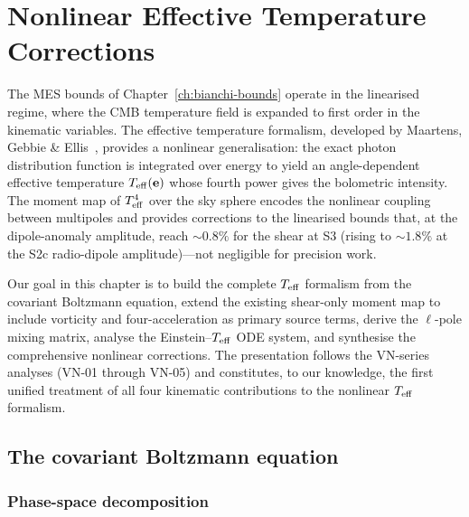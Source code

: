 
\chapter{Nonlinear Effective Temperature Corrections}
\label{ch:teff}

The MES bounds of Chapter~\ref{ch:bianchi-bounds} operate in the
linearised regime, where the CMB temperature field is expanded to
first order in the kinematic variables.  The effective temperature
formalism, developed by Maartens, Gebbie \&
Ellis~\cite{MaartensGE1999}, provides a nonlinear generalisation:
the exact photon distribution function is integrated over energy
to yield an angle-dependent effective temperature $T_{\mathrm{eff}}(\mathbf{e})$
whose fourth power gives the bolometric intensity.  The moment map
of $T_{\mathrm{eff}}^4$ over the sky sphere encodes the nonlinear coupling
between multipoles and provides corrections to the linearised bounds
that, at the dipole-anomaly amplitude, reach $\sim 0.8\%$ for the
shear at S3 (rising to $\sim 1.8\%$ at the S2c radio-dipole
amplitude)---not negligible for precision work.

Our goal in this chapter is to build the complete $T_{\mathrm{eff}}$ formalism
from the covariant Boltzmann equation, extend the existing
shear-only moment map to include vorticity and four-acceleration as
primary source terms, derive the $\ell$-pole mixing matrix, analyse
the Einstein--$T_{\mathrm{eff}}$ ODE system, and synthesise the comprehensive
nonlinear corrections.  The presentation follows the VN-series
analyses (VN-01 through VN-05) and constitutes, to our knowledge,
the first unified treatment of all four kinematic contributions to
the nonlinear $T_{\mathrm{eff}}$ formalism.


\section{The covariant Boltzmann equation}\label{sec:boltzmann-eq}

\subsection{Phase-space decomposition}\label{sec:phase-space}

